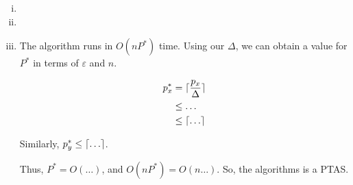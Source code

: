 \begin{enumerate}[(i)]
	\item
	\item
	\item The algorithm runs in $O(nP^*)$ time.
		Using our $\Delta$, we can obtain a value for $P^*$ in terms of $\varepsilon$ and $n$.

		\begin{align}
			p^*_x &= \ceil{\frac{p_x}{\Delta}}\\
			      &\leq \ldots\\
			      &\leq \ceil{\dots}
		\end{align}

		Similarly, $p^*_y \leq \lceil\ldots\rceil$.

		Thus, $P^* = O(\ldots)$, and $O(nP^*) = O(n\ldots)$.
		So, the algorithms is a PTAS.
\end{enumerate}
